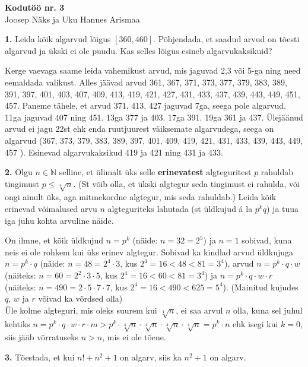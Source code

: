 \documentclass[a4paper, 10pt]{article}
\newcommand{\N}{\mathbb{N}}
\begin{document}
\begin{center}
\Large\textbf{Kodutöö nr. 3}\\
\small{Joosep Näks ja Uku Hannes Arismaa}
\end{center}

\bigskip

\noindent \textbf{1.} Leida k\~oik algarvud lõigus $[360, 460]$. Põhjendada, et saadud arvud on tõesti algarvud ja ükski ei ole puudu. Kas selles lõigus esineb alg\-arvukaksikuid?

\bigskip
Kerge vaevaga saame leida vahemikust arvud, mis jaguvad 2,3 või 5-ga ning need eemaldada valikust. Alles jäävad arvud 361, 367, 371, 373, 377, 379, 383, 389, 391, 397, 401, 403, 407, 409, 413, 419, 421, 427, 431, 433, 437, 439, 443, 449, 451, 457. Paneme tähele, et arvud 371, 413, 427 jaguvad 7ga, seega pole algarvud. 11ga jaguvad 407 ning 451. 13ga 377 ja 403. 17ga 391. 19ga 361 ja 437. Ülejäänud arvud ei jagu 22st ehk enda ruutjuurest väiksemate algarvudega, seega on algarvud (367, 373, 379, 383, 389, 397, 401, 409, 419, 421, 431, 433, 439, 443, 449, 457
). Esinevad algarvukaksikud 419 ja 421 ning 431 ja 433.
\bigskip

\noindent \textbf{2.} Olgu $n\in\N$ selline, et ülimalt üks selle {\bf erinevatest} algteguritest $p$ rahuldab tingimust $p\leq \sqrt[4]{n}$. (St võib olla, et ükski algtegur seda tingimust ei rahulda, või ongi ainult üks, aga mitmekordne algtegur, mis seda rahuldab.) Leida kõik erinevad võimalused arvu $n$ algteguriteks lahutada (st üldkujud \'a la $p^kq$) ja tuua iga juhu kohta arvuline näide. 

\bigskip

On ilmne, et kõik üldkujud $n=p^k$ (näide: $n=32=2^5$) ja $n=1$ sobivad, kuna neis ei ole rohkem kui üks erinev algtegur. Sobivad ka kindlad arvud üldkujuga $n=p^k\cdot q$ (näide: $n=48=2^4\cdot3$, kus $2^4=16<48<81=3^4$), arvud $n=p^k\cdot q\cdot w$ (näiteks: $n=60=2^2\cdot3\cdot5$, kus $2^4=16<60<81=3^4$) ja $n=p^k\cdot q\cdot w\cdot r$ (näiteks: $n=490=2\cdot5\cdot7\cdot7$, kus $2^4=16<490<625=5^4$). (Mainitud kujudes $q$, $w$ ja $r$ võivad ka võrdsed olla)\\
Üle kolme algteguri, mis oleks suurem kui $\sqrt[4]n$, ei saa arvul $n$ olla, kuna sel juhul kehtiks $n=p^k\cdot q\cdot w\cdot r\cdot m>p^k\cdot\sqrt[4]n\cdot\sqrt[4]n\cdot\sqrt[4]n\cdot\sqrt[4]n=p^k\cdot n$ ehk isegi kui $k=0$, siis jääb võrratuseks $n>n$, mis ei ole tõene.

\bigskip

\noindent \textbf{3.} Tõestada, et kui $n!+n^2+1$ on algarv, siis ka $n^2+1$ on algarv. 
\end{document}
